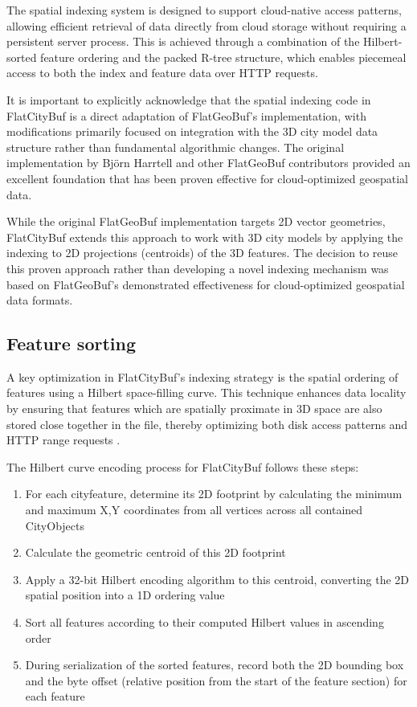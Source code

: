 The spatial indexing system is designed to support cloud-native access patterns, allowing efficient retrieval of data directly from cloud storage without requiring a persistent server process. This is achieved through a combination of the Hilbert-sorted feature ordering and the packed R-tree structure, which enables piecemeal access to both the index and feature data over HTTP requests.

It is important to explicitly acknowledge that the spatial indexing code in FlatCityBuf is a direct adaptation of FlatGeoBuf's implementation, with modifications primarily focused on integration with the 3D city model data structure rather than fundamental algorithmic changes. The original implementation by Björn Harrtell and other FlatGeoBuf contributors \citep{flatgeobuf} provided an excellent foundation that has been proven effective for cloud-optimized geospatial data.

While the original FlatGeoBuf implementation targets 2D vector geometries, FlatCityBuf extends this approach to work with 3D city models by applying the indexing to 2D projections (centroids) of the 3D features. The decision to reuse this proven approach rather than developing a novel indexing mechanism was based on FlatGeoBuf's demonstrated effectiveness for cloud-optimized geospatial data formats.

\subsection{Feature sorting}
\label{methodology:spatial_index:feature_sorting}

A key optimization in FlatCityBuf's indexing strategy is the spatial ordering of features using a Hilbert space-filling curve. This technique enhances data locality by ensuring that features which are spatially proximate in 3D space are also stored close together in the file, thereby optimizing both disk access patterns and HTTP range requests \citep{horance_2022_detail}.

The Hilbert curve encoding process for FlatCityBuf follows these steps:

\begin{enumerate}
  \item For each \ac{cityfeature}, determine its 2D footprint by calculating the minimum and maximum X,Y coordinates from all vertices across all contained CityObjects
  \item Calculate the geometric centroid of this 2D footprint
  \item Apply a 32-bit Hilbert encoding algorithm to this centroid, converting the 2D spatial position into a 1D ordering value
  \item Sort all features according to their computed Hilbert values in ascending order
  \item During serialization of the sorted features, record both the 2D bounding box and the byte offset (relative position from the start of the feature section) for each feature
\end{enumerate}

